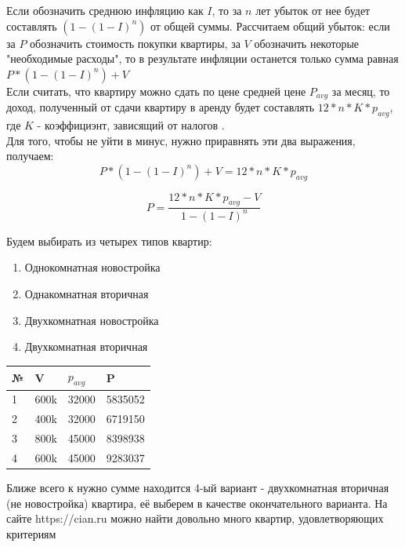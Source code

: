 Если обозначить среднюю инфляцию как $I$, то за $n$ лет убыток от нее будет составлять $(1-(1-I)^{n})$ от общей суммы. Рассчитаем общий убыток: если за $P$ обозначить стоимость покупки квартиры, за $V$ обозначить некоторые "необходимые расходы", то в результате инфляции останется только сумма равная $P*(1-(1-I)^{n}) + V$ \\
Если считать, что квартиру можно сдать по цене средней цене $P_{avg}$ за месяц, то доход, полученный от сдачи квартиру в аренду будет составлять $12*n*K*p_{avg}$, где $K$ - коэффициэнт, зависящий от налогов .\\ Для того, чтобы не уйти в минус, нужно приравнять эти два выражения, получаем:
\begin{equation}
P*(1-(1-I)^{n}) + V = 12*n*K*p_{avg}
\end{equation}

\begin{equation}
P = \frac{12*n*K*p_{avg} - V}{1-(1-I)^{n}}
\end{equation}

Будем выбирать из четырех типов квартир:
\begin{enumerate}
	\item Однокомнатная новостройка
	\item Однакомнатная вторичная
	\item Двухкомнатная новостройка
	\item Двухкомнатная вторичная
	
\end{enumerate}

\begin{center}
	\begin{tabular}{ | l | l | l | l|}
	\hline
    \textbf{№} & \textbf{V} & \textbf{$p_{avg}$} & \textbf{P}\\ \hline
    1 & 600k & 32000 & 5835052 \\ \hline
    2 & 400k & 32000 & 6719150 \\ \hline
    3 & 800k & 45000 & 8398938 \\ \hline
    4 & 600k & 45000 & 9283037 \\ \hline
	\end{tabular}
\end{center}

Ближе всего к нужно сумме находится 4-ый вариант - двухкомнатная вторичная (не новостройка) квартира, её выберем в качестве окончательного варианта.
На сайте https://cian.ru можно найти довольно много квартир, удовлетворяющих критериям

